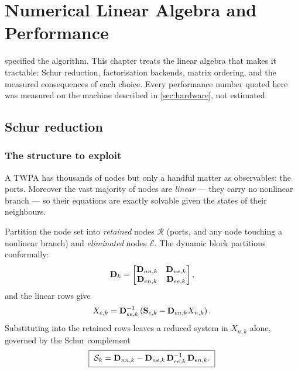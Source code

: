 \chapter{Numerical Linear Algebra and Performance}
\label{chap:numerics}

 specified the algorithm. This chapter treats the linear
algebra that makes it tractable: Schur reduction, factorisation backends, matrix
ordering, and the measured consequences of each choice. Every performance number
quoted here was measured on the machine described in \cref{sec:hardware}, not
estimated.

\section{Schur reduction}
\label{sec:schur}

\subsection{The structure to exploit}

A TWPA has thousands of nodes but only a handful matter as observables: the
ports. Moreover the vast majority of nodes are \emph{linear} --- they carry no
nonlinear branch --- so their equations are exactly solvable given the states of
their neighbours.

Partition the node set into \emph{retained} nodes $\mathcal{R}$ (ports, and any
node touching a nonlinear branch) and \emph{eliminated} nodes $\mathcal{E}$. The
dynamic block partitions conformally:
\begin{equation}
  \mathbf{D}_k =
  \begin{bmatrix}
    \mathbf{D}_{nn,k} & \mathbf{D}_{ne,k}\\
    \mathbf{D}_{en,k} & \mathbf{D}_{ee,k}
  \end{bmatrix},
\end{equation}
and the linear rows give
\begin{equation}
  X_{e,k} = \mathbf{D}_{ee,k}^{-1}\left(\mathbf{S}_{e,k} - \mathbf{D}_{en,k}X_{n,k}\right).
  \label{eq:back-substitution}
\end{equation}
Substituting into the retained rows leaves a reduced system in $X_{n,k}$ alone,
governed by the Schur complement
\begin{equation}
  \boxed{\;
  \mathcal{S}_k = \mathbf{D}_{nn,k} - \mathbf{D}_{ne,k}\,\mathbf{D}_{ee,k}^{-1}\,\mathbf{D}_{en,k}.
  \;}
  \label{eq:schur-complement}
\end{equation}

